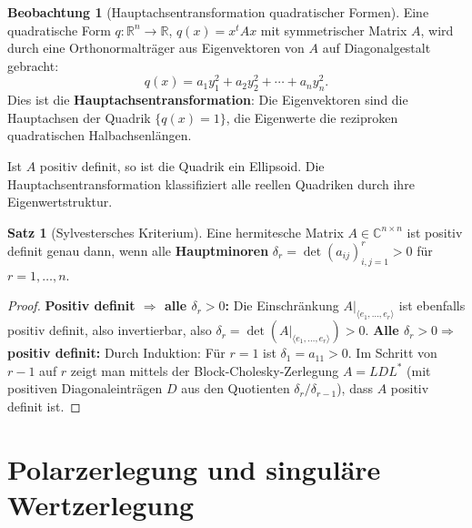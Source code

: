 ﻿\documentclass[a4paper,12pt]{report}
\theoremstyle{definition}
\newtheorem{satz}{Satz}
\newtheorem{beobachtung}{Beobachtung}
\begin{document}
\begin{beobachtung}[Hauptachsentransformation quadratischer Formen]
    Eine quadratische Form $q : \mathbb{R}^n \to \mathbb{R}$,
    $q(x) = x^t A x$ mit symmetrischer Matrix $A$, wird durch
    eine Orthonormalträger aus Eigenvektoren von $A$ auf
    Diagonalgestalt gebracht:
    \[
        q(x) = a_1 y_1^2 + a_2 y_2^2 + \cdots + a_n y_n^2.
    \]
    Dies ist die \textbf{Hauptachsentransformation}: Die Eigenvektoren
    sind die Hauptachsen der Quadrik $\{q(x) = 1\}$, die Eigenwerte
    die reziproken quadratischen Halbachsenlängen.

    Ist $A$ positiv definit, so ist die Quadrik ein Ellipsoid.
    Die Hauptachsentransformation klassifiziert alle reellen Quadriken
    durch ihre Eigenwertstruktur.
\end{beobachtung}

\begin{satz}[Sylvestersches Kriterium]
    Eine hermitesche Matrix $A \in \mathbb{C}^{n \times n}$ ist positiv
    definit genau dann, wenn alle \textbf{Hauptminoren}
    $\delta_r = \det(a_{ij})_{i,j=1}^r > 0$ für $r = 1, \dots, n$.
\end{satz}
\begin{proof}
    \textbf{Positiv definit $\Rightarrow$ alle $\delta_r > 0$:} Die
    Einschränkung $A|_{\langle e_1,\ldots,e_r\rangle}$ ist ebenfalls positiv definit,
    also invertierbar, also $\delta_r = \det(A|_{\langle e_1,\ldots,e_r\rangle}) > 0$.
    \textbf{Alle $\delta_r > 0 \Rightarrow$ positiv definit:} Durch Induktion:
    Für $r = 1$ ist $\delta_1 = a_{11} > 0$. Im Schritt von $r-1$ auf $r$ zeigt man
    mittels der Block-Cholesky-Zerlegung $A = L D L^*$ (mit positiven Diagonaleinträgen
    $D$ aus den Quotienten $\delta_r / \delta_{r-1}$), dass $A$ positiv definit ist.
\end{proof}


\section{Polarzerlegung und singuläre Wertzerlegung}
\end{document}
